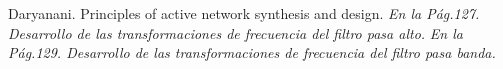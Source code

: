 \documentclass[informe.tex]{subfiles}
\begin{document}
Daryanani. Principles of active network synthesis and design. \newline
\tab[1cm]\textit{En la Pág.127. Desarrollo de las transformaciones de frecuencia del filtro pasa alto.}\newline
\tab[1cm]\textit{En la Pág.129. Desarrollo de las transformaciones de frecuencia del filtro pasa banda.}\newline
\end{document}
